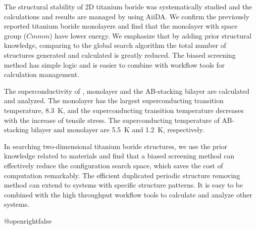 \documentclass[phd,nobackinfo]{scutthesis}
\begin{document}
\begin{englishabstract}
    The structural stability of 2D titanium boride was systematically studied and the calculations and results are managed by using AiiDA. We confirm the previously reported titanium boride monolayers and find that the  monolayer with space group ($Cmmm$) have lower energy. We emphasize that by adding prior structural knowledge, comparing to the global search algorithm the total number of structures generated and calculated is greatly reduced. The biased screening method has simple logic and is easier to combine with workflow tools for calculation management.

    The superconductivity of ,  monolayer and the AB-stacking  bilayer are calculated and analyzed. The monolayer  has the largest superconducting transition temperature, \SI{8.3}{\kelvin}, and the superconducting transition temperature decreases with the increase of tensile stress. The superconducting temperature of AB-stacking  bilayer and  monolayer are \SI{5.5}{\kelvin} and \SI{1.2}{\kelvin}, respectively.

    In searching two-dimensional titanium boride structures,  we use the prior knowledge related to materials and find that a biased screening method can effectively reduce the configuration search space, which saves the cost of computation remarkably. The efficient duplicated periodic structure removing method can extend to systems with specific structure patterns. It is easy to be combined with the high throughput workflow tools to calculate and analyze other systems.

\end{englishabstract}

\tableofcontents

\mainmatter

\csname @openrightfalse\endcsname

\newcommand*{\rom}[1]{\uppercase\expandafter{\romannumeral #1\relax}}


\end{document}
